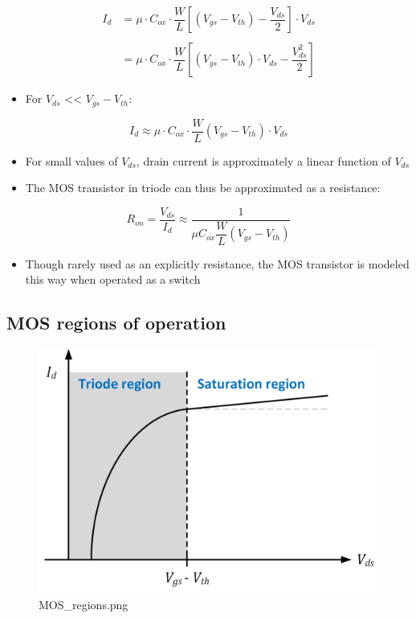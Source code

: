 \documentclass[11pt]{article}
\providecommand{\tightlist}{%
      \setlength{\itemsep}{0pt}\setlength{\parskip}{0pt}}
\begin{document}
    \begin{align}
I_d &= \mu \cdot C_{ox} \cdot \dfrac{W}{L} {\left[(V_{gs} - V_{th}) - \dfrac{V_{ds}}{2}\right]\cdot V_{ds}}\\
\\
&= \mu \cdot C_{ox} \cdot \dfrac{W}{L} {\left[(V_{gs} - V_{th})\cdot V_{ds} - \dfrac{V_{ds}^2}{2}\right]}
\end{align}

\begin{itemize}
\tightlist
\item
  For \(V_{ds}\) \textless\textless{} \(V_{gs}-V_{th}\):
\end{itemize}

\begin{equation}
I_d \approx \mu \cdot C_{ox} \cdot \dfrac{W}{L} {(V_{gs} - V_{th})\cdot V_{ds}}
\end{equation}

    \begin{itemize}
\tightlist
\item
  For small values of \(V_{ds}\), drain current is approximately a
  linear function of \(V_{ds}\)
\item
  The MOS transistor in triode can thus be approximated as a resistance:
\end{itemize}

\begin{equation}
\boxed{R_{on} = \dfrac{V_{ds}}{I_d} \approx \dfrac{1}{\mu C_{ox} \dfrac{W}{L} (V_{gs} - V_{th})}} 
\end{equation}

\begin{itemize}
\tightlist
\item
  Though rarely used as an explicitly resistance, the MOS transistor is
  modeled this way when operated as a switch
\end{itemize}

    \hypertarget{mos-regions-of-operation}{%
\subsection{MOS regions of operation}\label{mos-regions-of-operation}}

    \begin{figure}
\centering
\includegraphics{MOS_regions.png}
\caption{MOS\_regions.png}
\end{figure}
\end{document}
